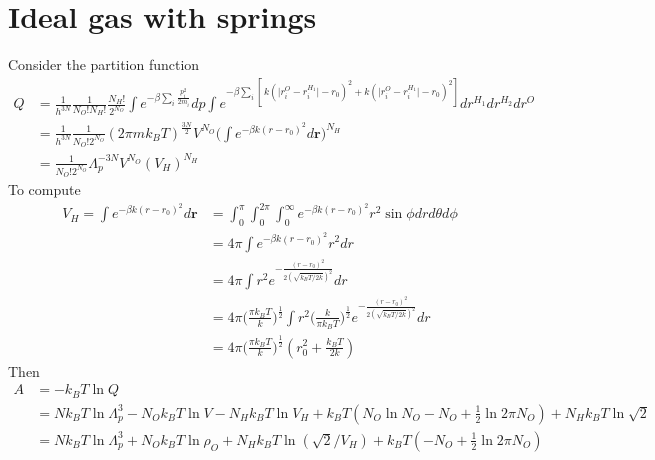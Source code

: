 \documentclass[aps,pre,a4paper,showkeys,fleqn]{revtex4}
\begin{document}
\section{Ideal gas with springs}
Consider the partition function
\begin{align*}
  Q
  &=
    \frac{1}{h^{3N}}\frac{1}{N_O! N_H!}
    \frac{N_H!}{2^{N_O}}
    \int e^{-\beta\sum_i\frac{p_i^2}{2m_i}} dp
    \int e^{-\beta \sum_i [\,k(\vert r^O_i-r^{H_1}_i\vert - r_0)^2 + k(\vert r^O_i-r^{H_1}_i\vert - r_0)^2]} dr^{H_1}dr^{H_2} dr^O\\
  &=
    \frac{1}{h^{3N}}\frac{1}{N_O! 2^{N_O}}
    (2\pi m k_BT)^{\frac{3N}{2}}
    V^{N_O}
    \Big(\int e^{-\beta k(r - r_0)^2 } d\bm r\Big)^{N_H} \\
  &=
    \frac{1}{N_O! 2^{N_O}}
    \Lambda_p^{-3N}
    V^{N_O}
    (V_H)^{N_H}
\end{align*}
To compute
\begin{align*}
  V_H = \int e^{-\beta k(r - r_0)^2 } d\bm r
  &= 
    \int_0^\pi\int_0^{2\pi}\int_0^\infty e^{-\beta k(r - r_0)^2 } r^2\sin\phi dr d\theta d\phi\\
  &=
    4\pi\int e^{-\beta k(r - r_0)^2 } r^2 dr\\
  & =
    4\pi\int r^2 e^{-\frac{(r - r_0)^2}{2 (\sqrt{k_BT/2k})^2}}dr\\
  & =
    4\pi \Big(\frac{\pi k_B T}{k}\Big)^\frac12
    \int r^2
    \Big(\frac{k}{\pi k_B T}\Big)^\frac12
    e^{-\frac{(r - r_0)^2}{2 (\sqrt{k_BT/2k})^2}}dr\\
  &=
    4\pi \Big(\frac{\pi k_B T}{k}\Big)^\frac12 (r_0^2 + \frac{k_BT}{2k})
\end{align*}
Then
\begin{align*}
  A
  &=
    -k_BT\ln Q\\
  &=
    Nk_BT\ln \Lambda_p^3
    -N_Ok_BT\ln V
    -N_Hk_BT\ln V_H
    + k_BT(N_O\ln N_O - N_O + \frac12\ln 2\pi N_O)
    + N_H k_BT\ln \sqrt2 \\
  &=
    Nk_BT\ln \Lambda_p^3
    + N_Ok_BT\ln\rho_O
    + N_Hk_BT\ln(\sqrt2/V_H)
    + k_BT( - N_O + \frac12\ln 2\pi N_O)
\end{align*}
\end{document}
